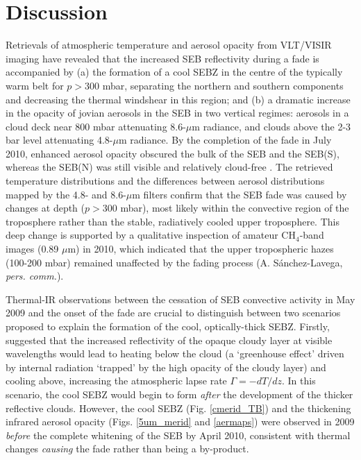 \documentclass[final,5p,times,twocolumn,authoryear]{elsarticle}
\begin{document}


\section{Discussion}
\label{discuss}

Retrievals of atmospheric temperature and aerosol opacity from VLT/VISIR imaging have revealed that the increased SEB reflectivity during a fade is accompanied by (a) the formation of a cool SEBZ in the centre of the typically warm belt for $p>300$ mbar, separating the northern and southern components and decreasing the thermal windshear in this region; and (b) a dramatic increase in the opacity of jovian aerosols in the SEB in two vertical regimes:  aerosols in a cloud deck near 800 mbar attenuating 8.6-$\mu$m radiance, and clouds above the 2-3 bar level attenuating 4.8-$\mu$m radiance.  By the completion of the fade in July 2010, enhanced aerosol opacity obscured the bulk of the SEB and the SEB(S), whereas the SEB(N) was still visible and relatively cloud-free \citep[typical of previous SEB life cycles,][]{96sanchez_jup}.  The retrieved temperature distributions and the differences between aerosol distributions mapped by the 4.8- and 8.6-$\mu$m filters confirm that the SEB fade was caused by changes at depth ($p>300$ mbar), most likely within the convective region of the troposphere rather than the stable, radiatively cooled upper troposphere.  This deep change is supported by a qualitative inspection of amateur CH$_4$-band images (0.89 $\mu$m) in 2010, which indicated that the upper tropospheric hazes (100-200 mbar) remained unaffected by the fading process (A. S\'{a}nchez-Lavega, \textit{pers. comm.}). 

Thermal-IR observations between the cessation of SEB convective activity in May 2009 and the onset of the fade are crucial to distinguish between two scenarios proposed to explain the formation of the cool, optically-thick SEBZ.  Firstly, \citet{96sanchez_jup} suggested that the increased reflectivity of the opaque cloudy layer at visible wavelengths would lead to heating below the cloud (a `greenhouse effect' driven by internal radiation `trapped' by the high opacity of the cloudy layer) and cooling above, increasing the atmospheric lapse rate $\Gamma=-dT/dz$.  In this scenario, the cool SEBZ would begin to form \textit{after} the development of the thicker reflective clouds.  However, the cool SEBZ (Fig. \ref{cmerid_TB}) and the thickening infrared aerosol opacity (Figs. \ref{5um_merid} and \ref{aermaps}) were observed in 2009 \textit{before} the complete whitening of the SEB by April 2010, consistent with thermal changes \textit{causing} the fade rather than being a by-product.  
\end{document}
